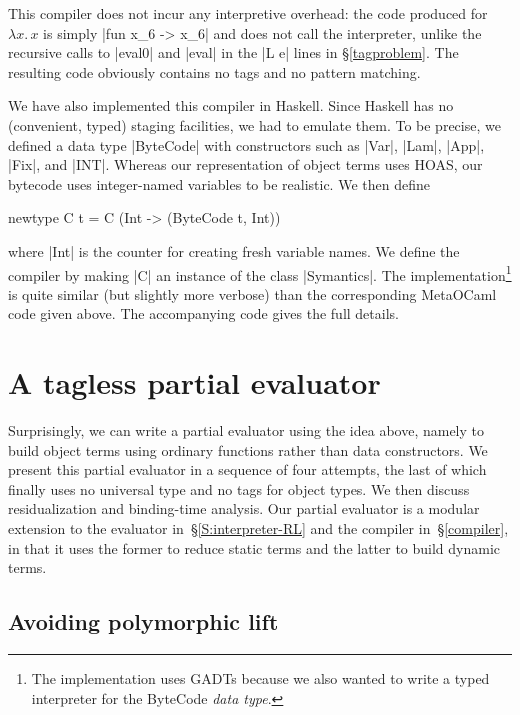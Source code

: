 \documentclass[preprint]{sigplanconf}
\newcommand{\fun}[1]{\mathopen{\lambda\mathord{#1}.\,}}
\begin{document}
This compiler does not incur
any interpretive overhead: the
code produced for $\fun{x}x$ is simply |fun x_6 -> x_6| and does not
  call the interpreter, unlike the recursive calls to |eval0| and
  |eval| in the |L e| lines in \S\ref{tagproblem}.
The resulting code obviously contains no tags and no pattern matching.

We have also implemented this compiler in Haskell. Since Haskell
has no (convenient, typed) staging facilities, we had to emulate
them. To be precise, we defined a data type |ByteCode| with
constructors such as |Var|, |Lam|, |App|, |Fix|, and |INT|.
Whereas our representation of object terms uses HOAS,
our bytecode uses integer-named
variables to be realistic. We then define 
\begin{code}
newtype C t = C (Int -> (ByteCode t, Int)) 
\end{code}
where |Int| is the counter for creating fresh variable
names. We define the compiler by making |C| an instance of the
class |Symantics|. The implementation\footnote{The implementation uses
GADTs because we also wanted to write a typed interpreter for 
the \textsf{ByteCode} \emph{data type}.} is quite similar (but slightly more
verbose) than the corresponding MetaOCaml code given above. The
accompanying code gives the full details.

\section{A tagless partial evaluator}\label{PE}

Surprisingly, we can write a partial evaluator using the idea above,
namely to build object terms using ordinary functions rather than data
constructors.  We present this partial evaluator in a sequence of four
attempts, the last of which finally uses no universal type and no tags
for object types.  We then discuss residualization and binding-time
analysis.  Our partial evaluator is a modular extension to the evaluator
in~\S\ref{S:interpreter-RL} and the compiler in~\S\ref{compiler}, in
that it uses the former to reduce static terms and the latter to build
dynamic terms.

\subsection{Avoiding polymorphic lift}
\label{S:PE-lift}
\end{document}
